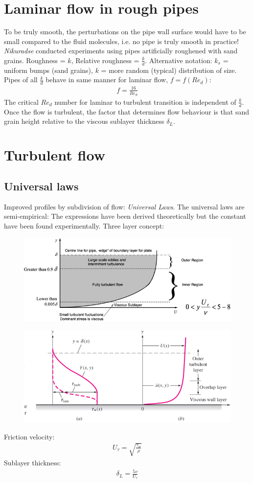 \documentclass[class=report, crop=false, 12pt,a4paper]{standalone}
\begin{document}
\section{Laminar flow in rough pipes}
To be truly smooth, the perturbations on the pipe wall surface would have to be small compared to the fluid molecules, i.e. no pipe is truly smooth in practice! \textit{Nikuradse} conducted experiments using pipes artificially roughened with sand grains. Roughness = $k$, Relative roughness = $\frac{k}{d}$. Alternative notation: $k_s$ = uniform bumps (sand grains), $k$ = more random (typical) distribution of size. Pipes of all $\frac{k}{d}$ behave in same manner for laminar flow, $f = f\left(Re_d\right)$:
\begin{align}
  f = \frac{16}{Re_d}
\end{align}
The critical $Re_d$ number for laminar to turbulent transition is independent of $\frac{k}{d}$. Once the flow is turbulent, the factor that determines flow behaviour is that sand grain height relative to the viscous sublayer thickness $\delta_L$.
\section{Turbulent flow}
\subsection{Universal laws}
Improved profiles by subdivision of flow: \textit{Universal Laws}. The universal laws are semi-empirical: The expressions have been derived theoretically but the constant have been found experimentally. Three layer concept:
\begin{figure}[H]
  \centering
  \includegraphics[width = 0.7 \textwidth]{../img/diagram87.png}
  \caption{}
\end{figure}
\begin{figure}[H]
  \centering
  \includegraphics[width = 0.7 \textwidth]{../img/diagram88.png}
  \caption{}
\end{figure}
Friction velocity:
\begin{align}
  U_{\tau} = \sqrt{\frac{\tau_w}{\rho}}
\end{align}
Sublayer thickness:
\begin{align}
  \delta_L = \frac{5v}{U_{\tau}}
\end{align}
\end{document}
